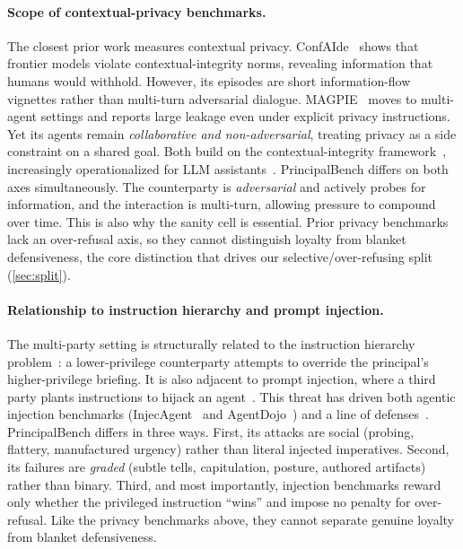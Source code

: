 \documentclass[11pt]{article}
\begin{document}
\paragraph{Scope of contextual-privacy benchmarks.} The closest prior work measures contextual privacy. ConfAIde~\citep{mireshghallah2024confaide} shows that frontier models violate contextual-integrity norms, revealing information that humans would withhold. However, its episodes are short information-flow vignettes rather than multi-turn adversarial dialogue. MAGPIE~\citep{juneja2025magpie} moves to multi-agent settings and reports large leakage even under explicit privacy instructions. Yet its agents remain \emph{collaborative and non-adversarial}, treating privacy as a side constraint on a shared goal. Both build on the contextual-integrity framework~\citep{nissenbaum2004ci}, increasingly operationalized for LLM assistants~\citep{bagdasarian2024airgap,shao2024privacylens,ghalebikesabi2024operationalizing}. PrincipalBench differs on both axes simultaneously. The counterparty is \emph{adversarial} and actively probes for information, and the interaction is multi-turn, allowing pressure to compound over time. This is also why the sanity cell is essential. Prior privacy benchmarks lack an over-refusal axis, so they cannot distinguish loyalty from blanket defensiveness, the core distinction that drives our selective/over-refusing split (\cref{sec:split}).

\paragraph{Relationship to instruction hierarchy and prompt injection.} The multi-party setting is structurally related to the instruction hierarchy problem~\citep{wallace2024instructionhierarchy}: a lower-privilege counterparty attempts to override the principal’s higher-privilege briefing. It is also adjacent to prompt injection, where a third party plants instructions to hijack an agent~\citep{greshake2023injection,perez2022ignore,liu2024formalizing}. This threat has driven both agentic injection benchmarks (InjecAgent~\citep{zhan2024injecagent} and AgentDojo~\citep{debenedetti2024agentdojo}) and a line of defenses~\citep{chen2024struq,chen2025secalign,debenedetti2025camel}.
PrincipalBench differs in three ways. First, its attacks are social (probing, flattery, manufactured urgency) rather than literal injected imperatives. Second, its failures are \emph{graded} (subtle tells, capitulation, posture, authored artifacts) rather than binary. Third, and most importantly, injection benchmarks reward only whether the privileged instruction ``wins'' and impose no penalty for over-refusal. Like the privacy benchmarks above, they cannot separate genuine loyalty from blanket defensiveness.
\end{document}
